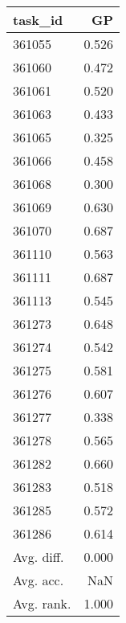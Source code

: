 \begin{tabular}{lr}
\toprule
task\_id & GP \\
\midrule
361055 & 0.526 \\
361060 & 0.472 \\
361061 & 0.520 \\
361063 & 0.433 \\
361065 & 0.325 \\
361066 & 0.458 \\
361068 & 0.300 \\
361069 & 0.630 \\
361070 & 0.687 \\
361110 & 0.563 \\
361111 & 0.687 \\
361113 & 0.545 \\
361273 & 0.648 \\
361274 & 0.542 \\
361275 & 0.581 \\
361276 & 0.607 \\
361277 & 0.338 \\
361278 & 0.565 \\
361282 & 0.660 \\
361283 & 0.518 \\
361285 & 0.572 \\
361286 & 0.614 \\
Avg. diff. & 0.000 \\
Avg. acc. & NaN \\
Avg. rank. & 1.000 \\
\bottomrule
\end{tabular}

